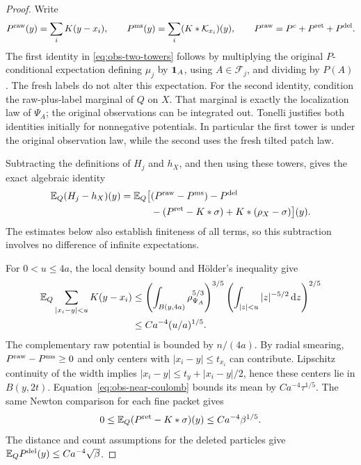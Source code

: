 \begin{proof}
Write
\[
 P^{\rm raw}(y)=\sum_iK(y-x_i),\qquad
 P^{\rm ms}(y)=\sum_i(K*\mathcal K_{x_i})(y),\qquad
 P^{\rm raw}=P^c+P^{\rm ret}+P^{\rm del}.
\]
The first identity in \eqref{eq:obs-two-towers} follows by multiplying
the original $P$-conditional expectation defining $\mu_j$ by
$\mathbf 1_A$, using $A\in\mathcal F_j$, and dividing by $P(A)$.
The fresh labels do not alter this expectation. For the second
identity, condition the raw-plus-label marginal of $Q$ on $X$.
That marginal is exactly the localization law of $\Psi_A$; the
original observations can be integrated out. Tonelli justifies
both identities initially for nonnegative potentials. In
particular the first tower is under the original observation
law, while the second uses the fresh tilted patch law.

Subtracting the definitions of $H_j$ and $h_X$, and then using
these towers, gives the exact algebraic identity
\begin{equation}\label{eq:obs-transfer-decomposition}
 \begin{split}
 \mathbb E_Q(H_j-h_X)(y)=\mathbb E_Q\big[&
 (P^{\rm raw}-P^{\rm ms})-P^{\rm del}\\
 &-(P^{\rm ret}-K*\sigma)+K*(\rho_X-\sigma)\big](y).
 \end{split}
\end{equation}
The estimates below also establish finiteness of all terms, so this
subtraction involves no difference of infinite expectations.

For $0<u\le4a$, the local density bound and H\"older's inequality
give
\begin{equation}\label{eq:obs-near-coulomb}
 \begin{split}
 \mathbb E_Q\sum_{|x_i-y|<u}K(y-x_i)
 &\le\left(\int_{B(y,4a)}\rho_{\Psi_A}^{5/3}\right)^{3/5}
       \left(\int_{|z|<u}|z|^{-5/2}\,\mathrm d z\right)^{2/5}\\
 &\le Ca^{-4}(u/a)^{1/5}.
 \end{split}
\end{equation}
The complementary raw potential is bounded by $n/(4a)$.
By radial smearing, $P^{\rm raw}-P^{\rm ms}\ge0$ and only centers
with $|x_i-y|\le t_{x_i}$ can contribute. Lipschitz continuity of
the width implies $|x_i-y|\le t_y+|x_i-y|/2$, hence these centers
lie in $B(y,2t)$. Equation~\eqref{eq:obs-near-coulomb} bounds its
mean by $Ca^{-4}\tau^{1/5}$. The same Newton comparison for each
fine packet gives
\[
 0\le\mathbb E_Q(P^{\rm ret}-K*\sigma)(y)
             \le Ca^{-4}\beta^{1/5}.
\]
The distance and count assumptions for the deleted particles give
$\mathbb E_Q P^{\rm del}(y)\le Ca^{-4}\sqrt\beta$.


\end{proof}
